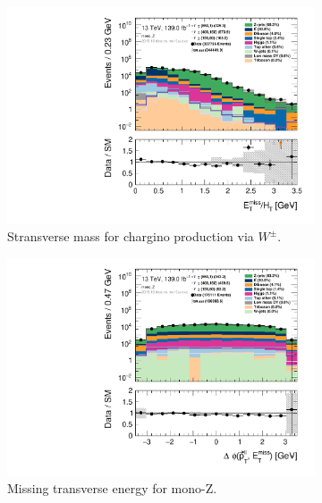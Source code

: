 \begin{figure}[H]
\begin{subfigure}[t!]{0.49\textwidth}
    \label{fig:my_label}
    \end{subfigure}
    \\
    \begin{subfigure}[t!]{0.49\textwidth}
        \includegraphics[width=\textwidth]{Figures/MonoZcuts/hist1d_met_HT_mono_Z.pdf}
    \caption{Stransverse mass for chargino production via $W^\pm$.}
    \label{fig:my_label}
    \end{subfigure}
    \begin{subfigure}[t!]{0.49\textwidth}
        \includegraphics[width=\textwidth]{Figures/MonoZcuts/hist1d_deltaPhi_mono_Z.pdf}
    \caption{Missing transverse energy for mono-Z.}
    \label{fig:my_label}
    \end{subfigure}
    \\
    \begin{subfigure}[t!]{0.49\textwidth}

\end{subfigure}
\end{figure}
